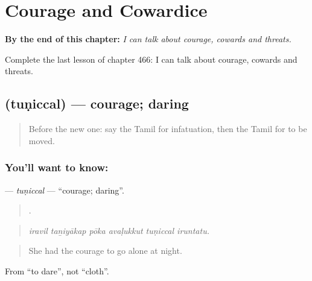 
\chapter{Courage and Cowardice}
\label{ch:ta-courage-and-cowardice}

\begin{chapteropening}
\textbf{By the end of this chapter:} \emph{I can talk about courage, cowards and threats.}

Complete the last lesson of chapter 466: I can talk about courage, cowards and threats.
\end{chapteropening}

\section[\texorpdfstring{\ta{துணிச்சல்} (tuṇiccal)}{துணிச்சல் (tuṇiccal)}]{ (tuṇiccal) — courage; daring}

\label{lesson:TA-C466-tuniccal}



\begin{quote}
Before the new one: say the Tamil for infatuation, then the Tamil for to be moved.
\end{quote}

\subsection*{You'll want to know: }
\textbf{} — \emph{tuṇiccal} — \textquotedblleft{}courage; daring\textquotedblright{}.

\begin{quote}
     .
\end{quote}

\begin{quote}
\emph{iravil taṉiyākap pōka avaḷukkut tuṇiccal iruntatu.}
\end{quote}

\begin{quote}
She had the courage to go alone at night.
\end{quote}

From  \textquotedblleft{}to dare\textquotedblright{}, not  \textquotedblleft{}cloth\textquotedblright{}.

